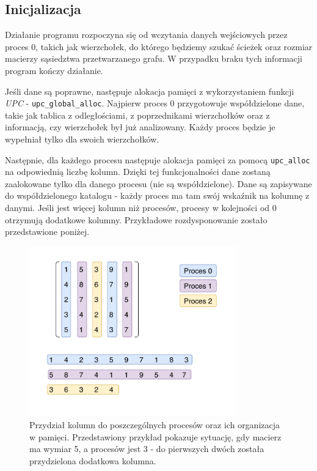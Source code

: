\documentclass[12pt]{article}
\begin{document}
\subsection{Inicjalizacja}
Działanie programu rozpoczyna się od wczytania danych wejściowych przez proces 0, takich jak wierzchołek, do którego będziemy szukać ścieżek oraz rozmiar macierzy sąsiedztwa przetwarzanego grafu. W przypadku braku tych informacji program kończy działanie.

Jeśli dane są poprawne, następuje alokacja pamięci z wykorzystaniem funkcji \textit{UPC} - \lstinline{upc_global_alloc}. Najpierw proces 0 przygotowuje współdzielone dane, takie jak tablica z odległościami, z poprzednikami wierzchołków oraz z informacją, czy wierzchołek był już analizowany. Każdy proces będzie je wypełniał tylko dla swoich wierzchołków.

Następnie, dla każdego procesu następuje alokacja pamięci za pomocą \lstinline{upc_alloc} na odpowiednią liczbę kolumn. Dzięki tej funkcjonalności dane zostaną zaalokowane tylko dla danego procesu (nie są współdzielone). Dane są zapisywane do współdzielonego katalogu - każdy proces ma tam swój wskaźnik na kolumnę z danymi. Jeśli jest więcej kolumn niż procesów, procesy w kolejności od 0 otrzymują dodatkowe kolumny. Przykładowe rozdysponowanie zostało przedstawione poniżej. 

\begin{figure}[H]
\centering
\includegraphics[width=0.8\textwidth]{data_division.pdf}
\caption{Przydział kolumn do poszczególnych procesów oraz ich organizacja w pamięci. Przedstawiony przykład pokazuje sytuację, gdy macierz ma wymiar 5, a procesów jest 3 - do pierwszych dwóch została przydzielona dodatkowa kolumna.}
\end{figure}
\end{document}
